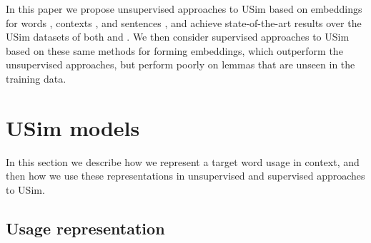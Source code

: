 \documentclass[11pt]{article}
\newcommand\glove{GloVe\xspace}
\begin{document}
In this paper we propose unsupervised approaches to USim based on
embeddings for words \cite{Mikolov+:2013b,pennington2014glove},
contexts \cite{melamud2016context2vec}, and sentences
\cite{Kiros+:2015}, and achieve state-of-the-art results over the
USim datasets of both  and . We then
consider supervised approaches to USim based on these same methods for
forming embeddings, which outperform the unsupervised approaches, but
perform poorly on lemmas that are unseen in the training data.

\section{USim models\label{sec:model}}



In this section we describe how we represent a target word usage in
context, and then how we use these representations in unsupervised and
supervised approaches to USim.



\subsection{Usage representation\label{sec:usagerep}}




\end{document}
